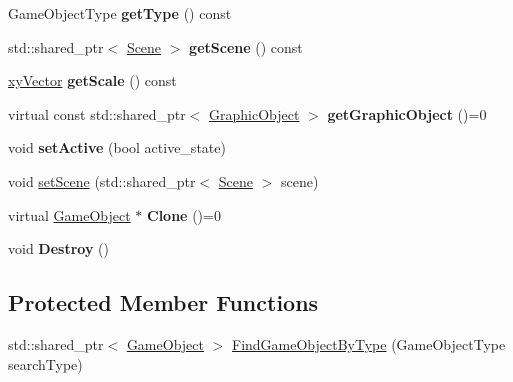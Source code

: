 \begin{DoxyCompactItemize}
\item 
\mbox{\label{class_game_object_af12345846c74b72bc50c779c00b55851}} 
Game\+Object\+Type {\bfseries get\+Type} () const
\item 
\mbox{\label{class_game_object_a9f4aec664bbb4fa5ecfa3d1a7d630d2a}} 
std\+::shared\+\_\+ptr$<$ \hyperlink{class_scene}{Scene} $>$ {\bfseries get\+Scene} () const
\item 
\mbox{\label{class_game_object_ab7854c363f11c202ea2177b33ce293e0}} 
\hyperlink{structxy_vector}{xy\+Vector} {\bfseries get\+Scale} () const
\item 
\mbox{\label{class_game_object_a32bd3769c0a9d09f0624dfdc22a032f3}} 
virtual const std\+::shared\+\_\+ptr$<$ \hyperlink{class_graphic_object}{Graphic\+Object} $>$ {\bfseries get\+Graphic\+Object} ()=0
\item 
\mbox{\label{class_game_object_a200218792aa0076011d69be696e3d3d4}} 
void {\bfseries set\+Active} (bool active\+\_\+state)
\item 
void \hyperlink{class_game_object_a9e1420c027ce937f9958a41ad280080b}{set\+Scene} (std\+::shared\+\_\+ptr$<$ \hyperlink{class_scene}{Scene} $>$ scene)
\item 
\mbox{\label{class_game_object_aba6be15984fdea37907c296619856e99}} 
virtual \hyperlink{class_game_object}{Game\+Object} $\ast$ {\bfseries Clone} ()=0
\item 
\mbox{\label{class_game_object_abf1959fad10ea04673a182029f1f81b9}} 
void {\bfseries Destroy} ()
\end{DoxyCompactItemize}
\subsection*{Protected Member Functions}
\begin{DoxyCompactItemize}
\item 
std\+::shared\+\_\+ptr$<$ \hyperlink{class_game_object}{Game\+Object} $>$ \hyperlink{class_game_object_ac52291835ad2f3f36363589af0d3ae84}{Find\+Game\+Object\+By\+Type} (Game\+Object\+Type search\+Type)
\end{DoxyCompactItemize}
